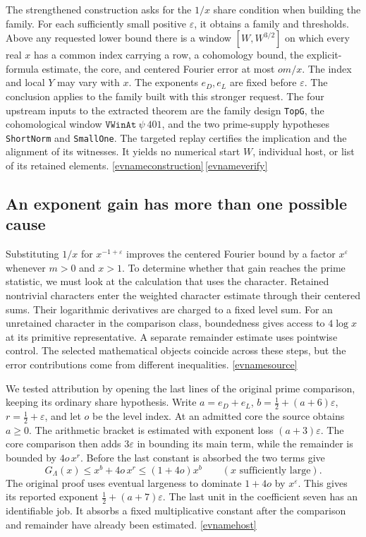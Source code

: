 \documentclass[11pt,letterpaper]{article}
\newcommand{\evref}[1]{\hyperlink{ev-#1}{\textsf{\small[\csname evname#1\endcsname]}}}
\begin{document}
The strengthened construction asks for the \(1/x\) share condition when building the family. For each sufficiently small positive \(\varepsilon\), it obtains a family and thresholds. Above any requested lower bound there is a window \([W,W^{3/2}]\) on which every real \(x\) has a common index carrying a row, a cohomology bound, the explicit-formula estimate, the core, and centered Fourier error at most \(om/x\). The index and local \(Y\) may vary with \(x\). The exponents \(e_D,e_L\) are fixed before \(\varepsilon\). The conclusion applies to the family built with this stronger request. The four upstream inputs to the extracted theorem are the family design \texttt{TopG}, the cohomological window \(\texttt{VWinAt}\ \psi\ 401\), and the two prime-supply hypotheses \texttt{ShortNorm} and \texttt{SmallOne}. The targeted replay certifies the implication and the alignment of its witnesses. It yields no numerical start \(W\), individual host, or list of its retained elements. \evref{construction}\,\evref{verify}

\subsection{An exponent gain has more than one possible cause}
\label{sec:retained-absorption}

Substituting \(1/x\) for \(x^{-1+\varepsilon}\) improves the centered Fourier bound by a factor \(x^\varepsilon\) whenever \(m>0\) and \(x>1\). To determine whether that gain reaches the prime statistic, we must look at the calculation that uses the character. Retained nontrivial characters enter the weighted character estimate through their centered sums. Their logarithmic derivatives are charged to a fixed level sum. For an unretained character in the comparison class, boundedness gives access to \(4\log x\) at its primitive representative. A separate remainder estimate uses pointwise control. The selected mathematical objects coincide across these steps, but the error contributions come from different inequalities. \evref{source}

We tested attribution by opening the last lines of the original prime comparison, keeping its ordinary share hypothesis. Write \(a=e_D+e_L\), \(b=\tfrac12+(a+6)\varepsilon\), \(r=\tfrac12+\varepsilon\), and let \(o\) be the level index. At an admitted core the source obtains \(a\geq0\). The arithmetic bracket is estimated with exponent loss \((a+3)\varepsilon\). The core comparison then adds \(3\varepsilon\) in bounding its main term, while the remainder is bounded by \(4o\,x^r\). Before the last constant is absorbed the two terms give
\begin{equation}
 G_\Lambda(x)\leq x^b+4o\,x^r
              \leq (1+4o)x^b
 \qquad (x\text{ sufficiently large}).
 \label{eq:retained-components}
\end{equation}
The original proof uses eventual largeness to dominate \(1+4o\) by \(x^\varepsilon\). This gives its reported exponent \(\tfrac12+(a+7)\varepsilon\). The last unit in the coefficient seven has an identifiable job. It absorbs a fixed multiplicative constant after the comparison and remainder have already been estimated. \evref{host}
\end{document}
